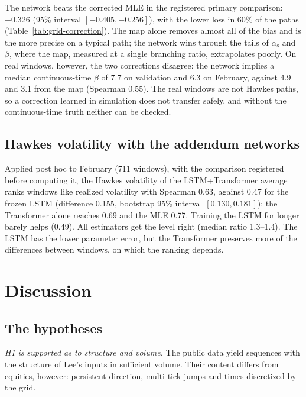\documentclass[preprint,12pt,authoryear]{elsarticle}
\newcommand{\aself}{\alpha_{\mathrm{s}}}
\begin{document}
The network beats the corrected MLE in the registered primary comparison: $-0.326$
(95\% interval $[-0.405,-0.256]$), with the lower loss in 60\% of the paths
(Table~\ref{tab:grid-correction}). The map alone removes almost all of the bias and is the
more precise on a typical path; the network wins through the tails of $\aself$ and $\beta$,
where the map, measured at a single branching ratio, extrapolates poorly. On real windows,
however, the two corrections disagree: the network implies a median continuous-time $\beta$
of 7.7 on validation and 6.3 on February, against 4.9 and 3.1 from the map (Spearman 0.55).
The real windows are not Hawkes paths, so a correction learned in simulation does not transfer
safely, and without the continuous-time truth neither can be checked.

\subsection{Hawkes volatility with the addendum networks}
\label{sec:vol-addendum}

Applied post hoc to February (711 windows), with the comparison registered before computing
it, the Hawkes volatility of the LSTM+Transformer average ranks windows like realized
volatility with Spearman 0.63, against 0.47 for the frozen LSTM (difference 0.155, bootstrap
95\% interval $[0.130,0.181]$); the Transformer alone reaches 0.69 and the MLE 0.77. Training
the LSTM for longer barely helps (0.49). All estimators get the level right (median ratio
1.3--1.4). The LSTM has the lower parameter error, but the Transformer preserves more of the
differences between windows, on which the ranking depends.

\section{Discussion}
\label{sec:discussion}

\subsection{The hypotheses}

\emph{H1 is supported as to structure and volume.} The public data yield sequences with the
structure of Lee's inputs in sufficient volume. Their content differs from equities, however:
persistent direction, multi-tick jumps and times discretized by the grid.
\end{document}
